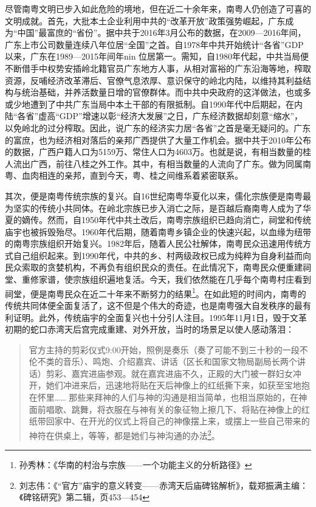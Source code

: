 尽管南粤文明已步入如此危险的境地，但在近二十余年来，南粤人仍创造了可喜的文明成就。首先，大批本土企业利用中共的“改革开放”政策强势崛起，广东成为“中国”最富庶的“省份”。据中共于2016年3月公布的数据，在2009—2016年间，广东上市公司数量连续八年位居“全国”之首。自1978年中共开始统计“各省”GDP以来，广东在1989—2015年间年nin 位居第一。需知，自1980年代起，中共当局便不断借手中权势安插岭北籍官员广东地方人事，从相对富裕的广东沿海等地，榨取资源，反哺经济改革滞后、官僚气息浓厚、意识保守的岭北内陆，以维持其利益结构与统治基础，并养活数量日增的官僚群体。而中共中央政府的这洋做法，也或多或少地遭到了中共广东当局中本土干部的有限抵制。自1990年代中后期起，在内陆“各省”虚高“GDP”增速以彰“经济大发展”之日，广东经济数据却刻意“缩水”，以免岭北的过分榨取。因此，说广东的经济实力居“各省”之首是毫无疑问的。广东的富庶，也为经济相对落后的亲邦广西提供了大量工作机会。据中共于2010年公布的数据，广西户籍人口为5159万、常住人口为4603万。也就是说，有相当数量的桂人流出广西，前往八桂之外工作。其中，有相当数量的人流向了广东。做为同属南粤、血肉相连的亲邦，直到今天，粤、桂之间维系着紧密联系。

其次，便是南粤传统宗族的复兴。自16世纪南粤华夏化以来，儒化宗族便是南粤最为坚实的传统小共同体。在岭北宗族已步入消亡之际，是百越后裔南粤人成为了华夏的嫡传。然而，自1950年代中共土改后，南粤宗族组织已趋向消亡，祠堂和传统庙宇也被拆毁殆尽。1960年代后期，随着南粤乡镇企业的快速兴起，以血缘为纽带的南粤宗族组织开始复兴。1982年后，随着人民公社解体，南粤民众迅速用传统方式自己组织起来。到1990年代，中共的乡、村两级政权已成为纯粹为自身利益而向民众索取的贪婪机构，不再负有组织民众的责任。在此情况下，南粤民众便重建祠堂、重修家谱，使宗族组织遍地复活。今天，我们依然能在几乎每个南粤村庄看到祠堂，便是南粤民众在近二十年来不断努力的结果\footnote{孙秀林：《华南的村治与宗族——一个功能主义的分析路径》}。在如此短的时间内，南粤的传统共同体便全面复活了，这不但是个伟大的奇迹，也是南粤强大自发秩序的最有利证明。此外，传统庙宇的全面复兴也十分引人注目。1995年11月1日，毁于文革初期的蛇口赤湾天后宫完成重建、对外开放，当时的场景足以使人感动落泪：

\begin{quote}

官方主持的剪彩仪式9:00开始，照例是奏乐（奏了可能不到三十秒的一段不伦不类的音乐）、鸣炮、介绍嘉宾、讲话（区长和国家文物局副局长两个讲话）剪彩、嘉宾进庙参观。就在嘉宾进庙不久，正殿的大门被一群妇女冲开，她们冲进来后，迅速地将贴在天后神像上的红纸撕下来，如获至宝地抱在怀里……
那些来拜神的人们与神的沟通是相当简单，也相当原始的，在神面前唱歌、跳舞，将衣服在与神有关的象征物上擦几下、将贴在神像上的红纸带回家中、在开光的仪式上将自己的神像摆上来，或摆上一些自己带来的神符在供桌上，等等，都是她们与神沟通的办法\footnote{刘志伟：《“官方”庙宇的意义转变——赤湾天后庙碑铭解析》，载郑振满主编：《碑铭研究》第二辑，页453—454}。

\end{quote}

